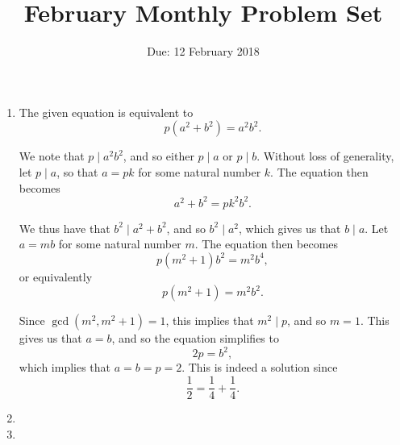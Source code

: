 \documentclass[12pt]{article}
\title{\vspace{-24pt}February Monthly Problem Set}
\author{Due: 12 February 2018}
\date{}
\begin{document}
 \maketitle \pagestyle{empty}

\begin{enumerate}

\item %
The given equation is equivalent to
\[
    p(a^2 + b^2) = a^2 b^2.
\]

We note that $p \mid a^2 b^2$, and so either $p \mid a$ or $p \mid
b$. Without loss of generality, let $p \mid a$, so that $a = pk$ for some
natural number $k$. The equation then becomes
\[
    a^2 + b^2 = pk^2 b^2.
\]

We thus have that $b^2 \mid a^2 + b^2$, and so $b^2 \mid a^2$, which
gives us that $b \mid a$. Let $a = mb$ for some natural number $m$. The
equation then becomes
\[
    p(m^2 + 1) b^2 = m^2 b^4,
\]
or equivalently
\[
    p(m^2 + 1) = m^2 b^2.
\]

Since $\gcd(m^2, m^2 + 1) = 1$, this implies that $m^2 \mid p$, and so $m =
1$. This gives us that $a = b$, and so the equation simplifies to
\[
    2p = b^2,
\]
which implies that $a = b = p = 2$. This is indeed a solution since
\[
    \frac{1}{2} = \frac{1}{4} + \frac{1}{4}.
\]

\item %


\item %



\end{enumerate}
\end{document}

